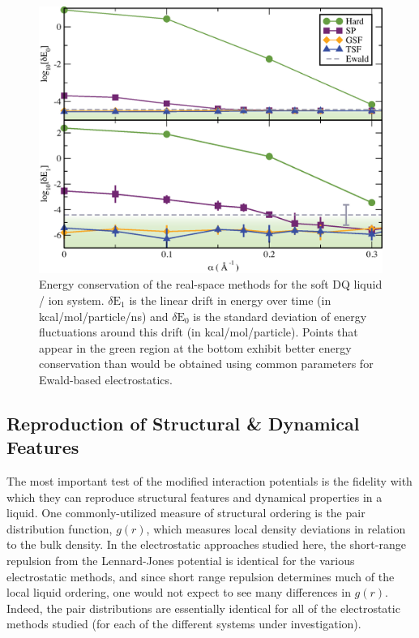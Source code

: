 \begin{figure}
  \centering
  \includegraphics[width=\textwidth]{finalDrift.eps}
  \caption{Energy conservation of the real-space methods for the soft
    DQ liquid / ion system. $\delta \mathrm{E}_1$ is the linear drift
    in energy over time (in kcal/mol/particle/ns) and $\delta
    \mathrm{E}_0$ is the standard deviation of energy fluctuations
    around this drift (in kcal/mol/particle).  Points that appear in
    the green region at the bottom exhibit better energy conservation
    than would be obtained using common parameters for Ewald-based
    electrostatics.\label{fig:energyDrift}}
\end{figure} 
\subsection{Reproduction of Structural \& Dynamical Features\label{sec:structure}}
The most important test of the modified interaction potentials is the
fidelity with which they can reproduce structural features and
dynamical properties in a liquid.  One commonly-utilized measure of
structural ordering is the pair distribution function, $g(r)$, which
measures local density deviations in relation to the bulk density.  In
the electrostatic approaches studied here, the short-range repulsion
from the Lennard-Jones potential is identical for the various
electrostatic methods, and since short range repulsion determines much
of the local liquid ordering, one would not expect to see many
differences in $g(r)$.  Indeed, the pair distributions are essentially
identical for all of the electrostatic methods studied (for each of
the different systems under investigation). 

